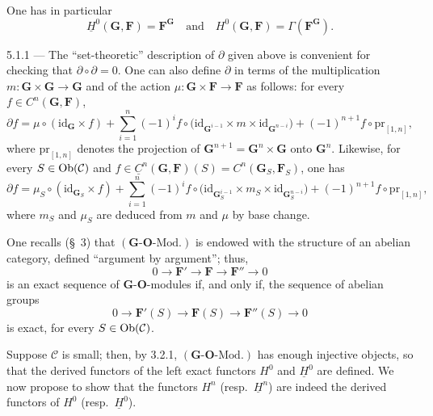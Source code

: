 One has in particular
\[
\underline{H}^{0}(\mathbf{G}, \mathbf{F}) = \mathbf{F}^{\mathbf{G}}
\quad\text{and}\quad
H^{0}(\mathbf{G}, \mathbf{F}) = \Gamma(\mathbf{F}^{\mathbf{G}}).
\]

\begin{remark}{5.1.1}\label{I.5.1.1}
--- {\renewcommand{\thefootnote}{(45)}}
The ``set-theoretic'' description of \(\partial\) given above is convenient
for checking that \(\partial \circ \partial = 0\). One can also define
\(\partial\) in terms of the multiplication
\(m \colon \mathbf{G} \times \mathbf{G} \to \mathbf{G}\) and of the action
\(\mu \colon \mathbf{G} \times \mathbf{F} \to \mathbf{F}\) as follows: for every
\(f \in C^{n}(\mathbf{G}, \mathbf{F})\),
\[
\partial f = \mu \circ (\mathrm{id}_{\mathbf{G}} \times f)
+ \sum_{i=1}^{n} (-1)^{i}
f \circ \bigl(\mathrm{id}_{\mathbf{G}^{i-1}} \times m
\times \mathrm{id}_{\mathbf{G}^{n-i}}\bigr)
+ (-1)^{n+1} f \circ \mathrm{pr}_{[1,n]},
\]
where \(\mathrm{pr}_{[1,n]}\) denotes the projection of
\(\mathbf{G}^{n+1} = \mathbf{G}^{n} \times \mathbf{G}\) onto
\(\mathbf{G}^{n}\). Likewise, for every \(S \in \operatorname{Ob}(\mathcal{C})\) and
\(f \in \underline{C}^{n}(\mathbf{G}, \mathbf{F})(S)
= C^{n}(\mathbf{G}_{S}, \mathbf{F}_{S})\), one has
\[
\partial f = \mu_{S} \circ (\mathrm{id}_{\mathbf{G}_{S}} \times f)
+ \sum_{i=1}^{n} (-1)^{i}
f \circ \bigl(\mathrm{id}_{\mathbf{G}_{S}^{i-1}} \times m_{S}
\times \mathrm{id}_{\mathbf{G}_{S}^{n-i}}\bigr)
+ (-1)^{n+1} f \circ \mathrm{pr}_{[1,n]},
\]
where \(m_{S}\) and \(\mu_{S}\) are deduced from \(m\) and \(\mu\) by base
change.
\end{remark}

\label{I.5.2}
{\renewcommand{\thefootnote}{(46)}}
One recalls (\cf \S~3) that \((\mathbf{G}\text{-}\mathbf{O}\text{-}\mathrm{Mod.})\)
is endowed with the structure of an abelian category, defined ``argument by
argument''; thus,
\[
0 \longrightarrow \mathbf{F}' \longrightarrow \mathbf{F}
\longrightarrow \mathbf{F}'' \longrightarrow 0
\]
is an exact sequence of \(\mathbf{G}\)-\(\mathbf{O}\)-modules if, and only if,
the sequence of abelian groups
\[
0 \longrightarrow \mathbf{F}'(S) \longrightarrow \mathbf{F}(S)
\longrightarrow \mathbf{F}''(S) \longrightarrow 0
\]
is exact, for every \(S \in \operatorname{Ob}(\mathcal{C})\).

{\renewcommand{\thefootnote}{(47)}}
Suppose \(\mathcal{C}\) is small; then, by 3.2.1,
\((\mathbf{G}\text{-}\mathbf{O}\text{-}\mathrm{Mod.})\) has enough injective
objects, so that the derived functors of the left exact functors \(H^{0}\) and
\(\underline{H}^{0}\) are defined. We now propose to show that the functors
\(H^{n}\) (resp.\ \(\underline{H}^{n}\)) are indeed the derived functors of
\(H^{0}\) (resp.\ \(\underline{H}^{0}\)).

